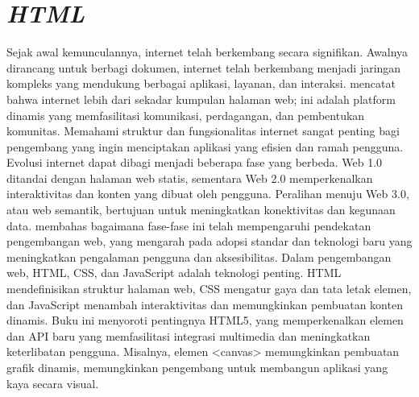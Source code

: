 \section{\textit{HTML}}
Sejak awal kemunculannya, internet telah berkembang secara signifikan. Awalnya dirancang untuk berbagi dokumen, internet telah berkembang menjadi jaringan kompleks yang mendukung berbagai aplikasi, layanan, dan interaksi.\@ \citet{franco2021html} mencatat bahwa internet lebih dari sekadar kumpulan halaman web; ini adalah platform dinamis yang memfasilitasi komunikasi, perdagangan, dan pembentukan komunitas. Memahami struktur dan fungsionalitas internet sangat penting bagi pengembang yang ingin menciptakan aplikasi yang efisien dan ramah pengguna.
\singlespacing{}
Evolusi internet dapat dibagi menjadi beberapa fase yang berbeda. Web 1.0 ditandai dengan halaman web statis, sementara Web 2.0 memperkenalkan interaktivitas dan konten yang dibuat oleh pengguna. Peralihan menuju Web 3.0, atau web semantik, bertujuan untuk meningkatkan konektivitas dan kegunaan data.\@ \citet{franco2021html} membahas bagaimana fase-fase ini telah mempengaruhi pendekatan pengembangan web, yang mengarah pada adopsi standar dan teknologi baru yang meningkatkan pengalaman pengguna dan aksesibilitas.
\singlespacing{}
Dalam pengembangan web, HTML, CSS, dan JavaScript adalah teknologi penting. HTML mendefinisikan struktur halaman web, CSS mengatur gaya dan tata letak elemen, dan JavaScript menambah interaktivitas dan memungkinkan pembuatan konten dinamis. Buku ini menyoroti pentingnya HTML5, yang memperkenalkan elemen dan API baru yang memfasilitasi integrasi multimedia dan meningkatkan keterlibatan pengguna. Misalnya, elemen <canvas> memungkinkan pembuatan grafik dinamis, memungkinkan pengembang untuk membangun aplikasi yang kaya secara visual.

